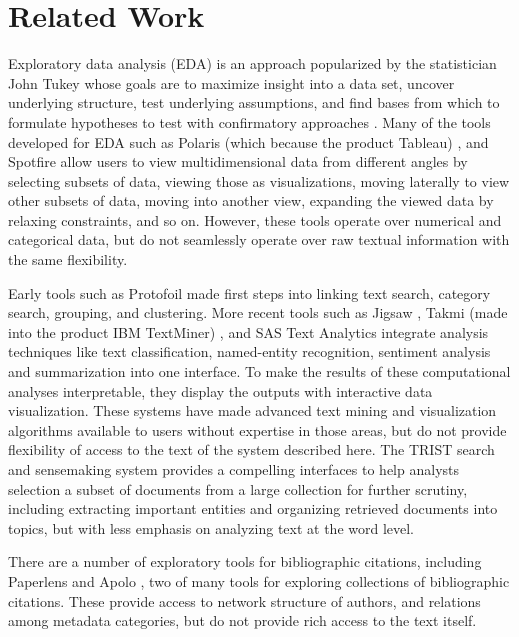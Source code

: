 




\section{Related Work}

Exploratory data analysis  (EDA) is an approach popularized by the statistician John Tukey whose goals are to maximize insight into a data set, uncover underlying structure, test underlying assumptions, and find bases from which to formulate hypotheses to test with confirmatory approaches \cite{turkey1977exploratory,tukey1980we}.  Many of the tools developed for EDA such as Polaris (which because the product Tableau) \cite{stotle2002polaris}, and Spotfire \cite{ahlberg1996spotfire} allow users to view multidimensional data from different angles by selecting subsets of data, viewing those as visualizations, moving laterally to view other subsets of data, moving into another view, expanding the viewed data by relaxing constraints, and so on.  However, these tools operate over numerical and categorical data, but do not seamlessly operate over raw textual information with the same flexibility. 


 Early tools such as Protofoil \cite{rao1994protofoil} made first steps into linking text search, category search, grouping, and clustering.  More recent tools such as Jigsaw \cite{stasko2008jigsaw},  Takmi (made into the product IBM TextMiner) \cite{uramoto2004text}, and SAS Text Analytics \cite{} integrate analysis techniques like text classification, named-entity recognition, sentiment analysis and summarization into one interface. 
 To make the results of these computational analyses interpretable, they display the outputs with interactive data visualization. These systems have made advanced text mining and visualization algorithms available to users without expertise in those areas, but do not provide flexibility of  access to the text of the system described here.   The TRIST search and sensemaking system \cite{jonker2005information} provides a compelling interfaces to help analysts selection a subset of documents from a large collection for further scrutiny, including extracting important entities and organizing retrieved documents into topics, but with less emphasis on analyzing text at the word level.

There are a number of exploratory tools for bibliographic citations, including Paperlens \cite{lee2005understanding} and Apolo \cite{chau2011apolo}, two  of many tools for exploring collections of bibliographic citations.  These provide access to network structure of authors, and relations among metadata categories, but do not provide rich access to the text itself.


